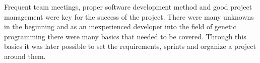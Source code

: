 Frequent team meetings, proper software development method and good project management were key for the success of the project.
There were many unknowns in the beginning and as an inexperienced developer into the field of genetic
programming there were many basics that needed to be covered. Through this basics it was later possible to set the requirements,
sprints and organize a project around them.